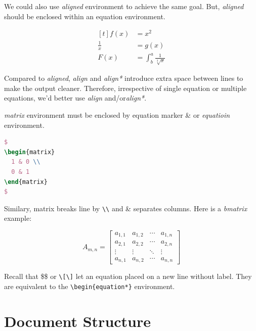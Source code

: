 We could also use \textit{aligned} environment to achieve the same
goal. But, \textit{aligned} should be enclosed within an equation
environment.

\[
  \begin{aligned}[t]
    \label{eq:eq-alignment}
    f(x) &= x^2 \\
    \frac{1}{x} &= g(x) \\
    F(x) &= \int^a_b \frac{1}{\sqrt[3]{x}}
  \end{aligned}
\]

Compared to \textit{aligned}, \textit{align} and \textit{align*}
introduce extra space between lines to make the output
cleaner. Therefore, irrespective of single equation or multiple
equations, we'd better use \textit{align} and/or\textit{align*}.

\textit{matrix} environment must be enclosed by equation marker \&
or \textit{equatioin} environment.

\begin{lstlisting}[language=TeX,caption={Matrix},label={lst:matrix-marker}]
$
\begin{matrix}
  1 & 0 \\
  0 & 1
\end{matrix}
$
\end{lstlisting}

Similary, matrix breaks line by \verb|\\| and \& separates
columns. Here is a \textit{bmatrix} example:

\begin{equation}
  \label{eq:nn-matrix}
  A_{m,n} =
  \begin{bmatrix}
    a_{1,1} & a_{1,2} & \cdots & a_{1,n} \\
    a_{2,1} & a_{2,2} & \cdots & a_{2,n} \\
    \vdots & \vdots & \ddots & \vdots \\
    a_{n,1} & a_{n,2} & \cdots & a_{n,n}
  \end{bmatrix}  
\end{equation}

Recall that \$\$ or \verb|\[\]| let an equation placed on a new
line without label. They are equivalent to the
\verb|\begin{equation*}| environment.

\section{Document Structure}
\label{sec:file-structure}

